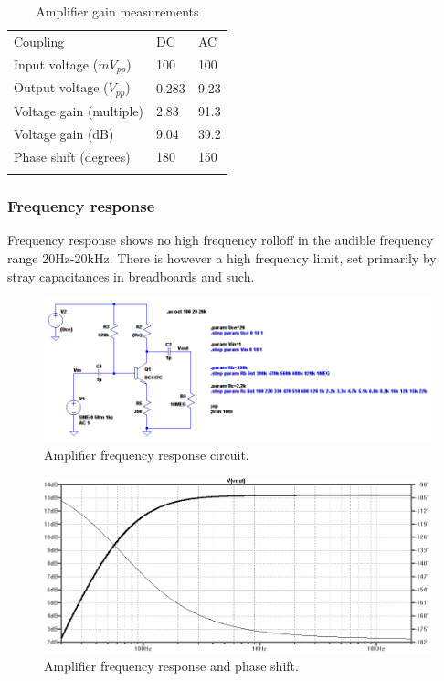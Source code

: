 \documentclass[11pt,a4paper]{article}
\begin{document}
\begin{longtable}[c]{lll}
\toprule\addlinespace
Coupling & DC & AC
\\\addlinespace
\midrule\endhead
Input voltage ($mV_{pp}$) & 100 & 100
\\\addlinespace
Output voltage ($V_{pp}$) & 0.283 & 9.23
\\\addlinespace
Voltage gain (multiple) & 2.83 & 91.3
\\\addlinespace
Voltage gain (dB) & 9.04 & 39.2
\\\addlinespace
Phase shift (degrees) & 180 & 150
\\\addlinespace
\bottomrule
\addlinespace
\caption{Amplifier gain measurements}
\end{longtable}

\subsubsection{Frequency response}\label{frequency-response}
Frequency response shows no high frequency rolloff in the audible frequency
range 20Hz-20kHz. There is however a high frequency limit, set primarily by
stray capacitances in breadboards and such.

\begin{figure}[htbp]
    \centering
    \includegraphics[width=\textwidth]{img/6_amplifier-av_schem.png}
    \caption{Amplifier frequency response circuit.}
    \label{fig:6_amplifier-av_schem}
\end{figure}

\begin{figure}[htbp]
    \centering
    \includegraphics[width=\textwidth]{img/6_amplifier-av_bode.png}
    \caption{Amplifier frequency response and phase shift.}
    \label{fig:6_amplifier-av_bode}
\end{figure}
\end{document}
